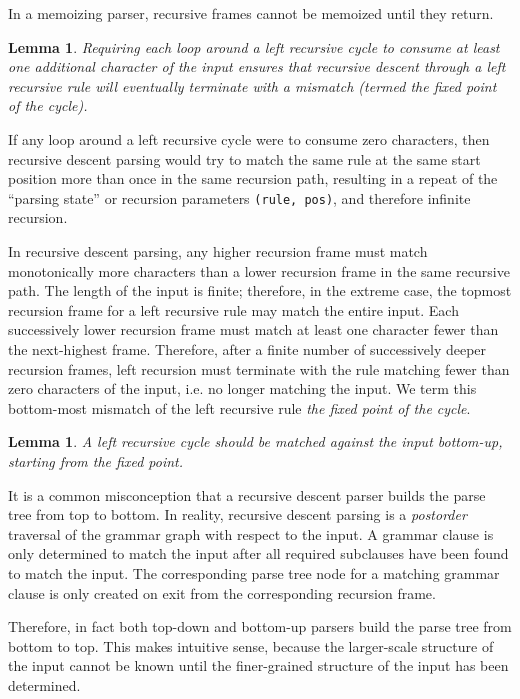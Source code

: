 \documentclass[manuscript]{acmart}
\newtheorem{lemma}[theorem]{Lemma}
\begin{document}
In a memoizing parser, recursive frames cannot be memoized until they return. 

\begin{lemma}
Requiring each loop around a left recursive cycle to consume at least one additional character of the input ensures that recursive descent through a left recursive rule will eventually terminate with a mismatch (termed the \emph{fixed point} of the cycle). 
\end{lemma}

If any loop around a left recursive cycle were to consume zero characters, then recursive descent parsing would try to match the same rule at the same start position more than once in the same recursion path, resulting in a repeat of the ``parsing state'' or recursion parameters \texttt{(rule, pos)}, and therefore infinite recursion.

In recursive descent parsing, any higher recursion frame must match monotonically more characters than a lower recursion frame in the same recursive path. The length of the input is finite; therefore, in the extreme case, the topmost recursion frame for a left recursive rule may match the entire input. Each successively lower recursion frame must match at least one character fewer than the next-highest frame. Therefore, after a finite number of successively deeper recursion frames, left recursion must terminate with the rule matching fewer than zero characters of the input, i.e. no longer matching the input. We term this bottom-most mismatch of the left recursive rule \emph{the fixed point of the cycle}.

\begin{lemma}
A left recursive cycle should be matched against the input bottom-up, starting from the fixed point.
\end{lemma}

It is a common misconception that a recursive descent parser builds the parse tree from top to bottom. In reality, recursive descent parsing is a \emph{postorder} traversal of the grammar graph with respect to the input. A grammar clause is only determined to match the input after all required subclauses have been found to match the input. The corresponding parse tree node for a matching grammar clause is only created on exit from the corresponding recursion frame.

Therefore, in fact both top-down and bottom-up parsers build the parse tree from bottom to top. This makes intuitive sense, because the larger-scale structure of the input cannot be known until the finer-grained structure of the input has been determined.
\end{document}
